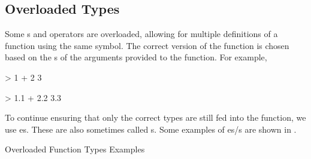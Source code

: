 \subsection{Overloaded Types}\label{subsec:Overloaded_Types}
Some s and operators are overloaded, allowing for multiple definitions of a function using the same symbol.
The correct version of the function is chosen based on the s of the arguments provided to the function.
For example,
\begin{haskellsource}
> 1 + 2
3

> 1.1 + 2.2
3.3
\end{haskellsource}

To continue ensuring that only the correct types are still fed into the function, we use es.
These are also sometimes called s.
Some examples of es/s are shown in .

\begin{listing}[h!tbp]
\caption{Overloaded Function Types Examples}
\label{lst:Overloaded_Types_Examples}
\end{listing}


